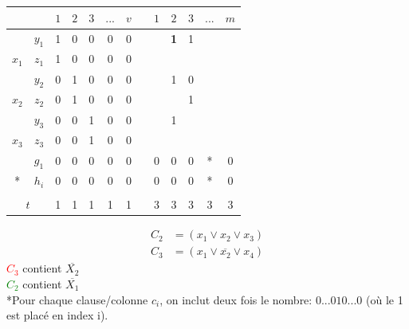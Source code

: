 \documentclass[a4paper,12pt]{article}
\begin{document}
    \begin{table}[h]
      \centering
      \begin{tabular}{c|c|c|c|c|c|c|c|c|c|c|c|c|}
	\cline{3-13}
	\multicolumn{2}{c|}{} & $1$ & $2$ & $3$ & $...$ & $v$ &  & $1$ & $2$ & $3$ & $...$ & $m$ \\ \hline
	\multicolumn{1}{|c|}{} & $y_1$ & 1 & 0 & 0 & 0 & 0 &  &  & {\color[HTML]{32CB00} \textbf{1}} & 1 &  &  \\ \cline{2-13}
	\multicolumn{1}{|c|}{\multirow{-2}{*}{$x_1$}} & $z_1$ & 1 & 0 & 0 & 0 & 0 &  &  &  &  &  &  \\ \hline
	\multicolumn{1}{|c|}{} & $y_2$ & 0 & 1 & 0 & 0 & 0 &  &  & 1 & 0 &  &  \\ \cline{2-13}
	\multicolumn{1}{|c|}{\multirow{-2}{*}{$x_2$}} & $z_2$ & 0 & 1 & 0 & 0 & 0 &  &  &  & {\color[HTML]{FD6864} 1} &  &  \\ \hline
	\multicolumn{1}{|c|}{} & $y_3$ & 0 & 0 & 1 & 0 & 0 &  &  & 1 &  &  &  \\ \cline{2-13}
	\multicolumn{1}{|c|}{\multirow{-2}{*}{$x_3$}} & $z_3$ & 0 & 0 & 1 & 0 & 0 &  &  &  &  &  &  \\ \hline
	\multicolumn{1}{|c|}{} & $g_1$ & 0 & 0 & 0 & 0 & 0 &  & 0 & 0 & 0 & * & 0 \\ \cline{2-13}
	\multicolumn{1}{|c|}{\multirow{-2}{*}{*}} & $h_i$ & 0 & 0 & 0 & 0 & 0 &  & 0 & 0 & 0 & * & 0 \\ \hline
	\multicolumn{2}{|c|}{} &  &  &  &  &  &  &  &  &  &  &  \\ \hline
	\multicolumn{2}{|c|}{$t$} & 1 & 1 & 1 & 1 & 1 &  & 3 & 3 & 3 & 3 & 3 \\ \hline
      \end{tabular}
    \end{table}

    \begin{align*}
      C_2 &= (x_1 \vee x_2 \vee x_3)\\
      C_3 &= (x_1 \vee \overline{x_2} \vee x_4)
    \end{align*}
    \textcolor{red}{$C_3$} contient $\overline{X_2}$\\
    \textcolor{green}{$C_2$} contient $\overline{X_1}$\\

    *Pour chaque clause/colonne $c_i$, on inclut deux fois le nombre: $0...010...0$ (où le 1 est placé en index i).
\end{document}
